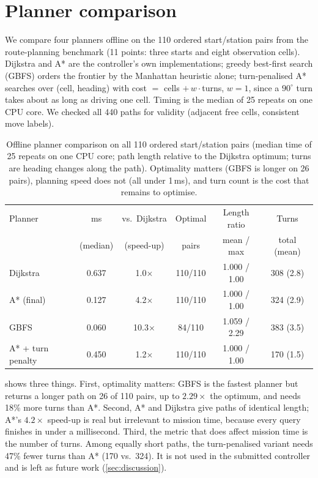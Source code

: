 \appendix
\section{Planner comparison}
\label{app:planners}

We compare four planners offline on the 110 ordered start/station pairs from the route-planning benchmark (11 points: three starts and eight observation cells). Dijkstra and A* are the controller's own implementations; greedy best-first search (GBFS) orders the frontier by the Manhattan heuristic alone; turn-penalised A* searches over (cell, heading) with cost $=$ cells $+\,w\cdot$turns, $w=1$, since a $90^\circ$ turn takes about as long as driving one cell. Timing is the median of 25 repeats on one CPU core. We checked all 440 paths for validity (adjacent free cells, consistent move labels).

\begin{table}[tbp]
  \centering\small
  \setlength{\tabcolsep}{3pt}
  \begin{tabular}{@{}lccccc@{}}
    \toprule
    Planner & ms & vs.\ Dijkstra & Optimal & Length ratio & Turns \\
            & (median) & (speed-up) & pairs & mean / max & total (mean) \\
    \midrule
    Dijkstra              & 0.637 & 1.0$\times$  & 110/110 & 1.000 / 1.00 & 308 (2.8) \\
    A* (final)            & 0.127 & 4.2$\times$  & 110/110 & 1.000 / 1.00 & 324 (2.9) \\
    GBFS                  & 0.060 & 10.3$\times$ & 84/110  & 1.059 / 2.29 & 383 (3.5) \\
    A* + turn penalty     & 0.450 & 1.2$\times$  & 110/110 & 1.000 / 1.00 & 170 (1.5) \\
    \bottomrule
  \end{tabular}
  \caption{Offline planner comparison on all 110 ordered start/station pairs (median time of 25 repeats on one CPU core; path length relative to the Dijkstra optimum; turns are heading changes along the path). Optimality matters (GBFS is longer on 26 pairs), planning speed does not (all under 1\,ms), and turn count is the cost that remains to optimise.}
  \label{tab:planners}
\end{table}

 shows three things. First, optimality matters: GBFS is the fastest planner but returns a longer path on 26 of 110 pairs, up to $2.29\times$ the optimum, and needs 18\% more turns than A*. Second, A* and Dijkstra give paths of identical length; A*'s $4.2\times$ speed-up is real but irrelevant to mission time, because every query finishes in under a millisecond. Third, the metric that does affect mission time is the number of turns. Among equally short paths, the turn-penalised variant needs 47\% fewer turns than A* (170 vs.\ 324). It is not used in the submitted controller and is left as future work (\cref{sec:discussion}).

